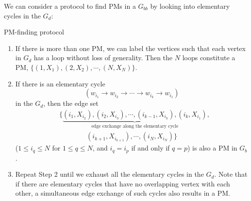 \documentclass[a4paper,twocolumn,8pt,accepted=2021-12-15]{quantumarticle}
\newcommand{\nn}{\nonumber}
\begin{document}
	We can consider a protocol to find PMs in a $G_{bb}$ by looking into elementary cycles in the $G_d$:
	
	$ $\\
	PM-finding protocol
	\begin{enumerate}
		\item 
		If there is more than one PM, we can label the vertices such that each vertex in $G_d$ has a loop without loss of generality. Then the $N$ loops constitute a PM, $\{(1,X_{1}),(2,X_{2}),\cdots, (N,X_{N})\}$.
		\item 
		If there is an elementary cycle 
		\[
		(w_{i_1}\to w_{i_2}\to \cdots \to w_{i_{k}} \to w_{i_1})
		\]
		in the $G_d$, then the edge set %
		\begin{align}\label{PMs}
			&\{\underbrace{(i_1,X_{i_2}),(i_2,X_{i_3}),\cdots, (i_{k-1},X_{i_{k}}),(i_{k},X_{i_1})}_{\textrm{edge exchange along the elementary cycle} },\nn \\
			&\qquad\qquad
			(i_{k+1},X_{i_{k+1}}),\cdots, (i_{N},X_{i_{N}})\}
			\nonumber
		\end{align} ($1\le i_q\le N$ for $1\le q \le N$, and $i_q= i_{p}$  if and only if $q=p$)	 is also a PM in $G_b$.
		\item
		Repeat Step 2 until we exhaust all the elementary cycles in the $G_{d}$. 
		Note that if there are elementary cycles that have no overlapping vertex with each other, a simultaneous edge exchange of such cycles also results in a PM. 
	\end{enumerate}
	
\end{document}
